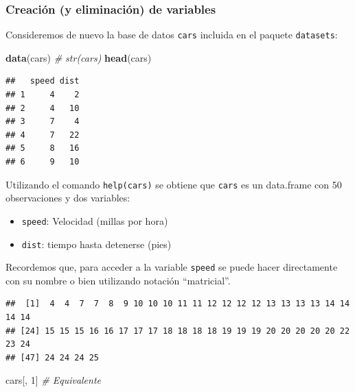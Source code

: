 \documentclass[]{book}
\newenvironment{Shaded}{\begin{snugshade}}{\end{snugshade}}
\newcommand{\KeywordTok}[1]{\textcolor[rgb]{0.13,0.29,0.53}{\textbf{#1}}}
\newcommand{\DecValTok}[1]{\textcolor[rgb]{0.00,0.00,0.81}{#1}}
\newcommand{\CommentTok}[1]{\textcolor[rgb]{0.56,0.35,0.01}{\textit{#1}}}
\newcommand{\OperatorTok}[1]{\textcolor[rgb]{0.81,0.36,0.00}{\textbf{#1}}}
\newcommand{\NormalTok}[1]{#1}
\begin{document}
\subsubsection{Creación (y eliminación) de
variables}\label{creacion-y-eliminacion-de-variables}

Consideremos de nuevo la base de datos \texttt{cars} incluida en el
paquete \texttt{datasets}:

\begin{Shaded}
\begin{Highlighting}[]
\KeywordTok{data}\NormalTok{(cars)}
\CommentTok{# str(cars)}
\KeywordTok{head}\NormalTok{(cars)}
\end{Highlighting}
\end{Shaded}

\begin{verbatim}
##   speed dist
## 1     4    2
## 2     4   10
## 3     7    4
## 4     7   22
## 5     8   16
## 6     9   10
\end{verbatim}

Utilizando el comando \texttt{help(cars)} se obtiene que \texttt{cars}
es un data.frame con 50 observaciones y dos variables:

\begin{itemize}
\item
  \texttt{speed}: Velocidad (millas por hora)
\item
  \texttt{dist}: tiempo hasta detenerse (pies)
\end{itemize}

Recordemos que, para acceder a la variable \texttt{speed} se puede hacer
directamente con su nombre o bien utilizando notación ``matricial''.

\begin{Shaded}
\end{Shaded}

\begin{verbatim}
##  [1]  4  4  7  7  8  9 10 10 10 11 11 12 12 12 12 13 13 13 13 14 14 14 14
## [24] 15 15 15 16 16 17 17 17 18 18 18 18 19 19 19 20 20 20 20 20 22 23 24
## [47] 24 24 24 25
\end{verbatim}

\begin{Shaded}
\begin{Highlighting}[]
\NormalTok{cars[, }\DecValTok{1}\NormalTok{]  }\CommentTok{# Equivalente}
\end{Highlighting}
\end{Shaded}
\end{document}
